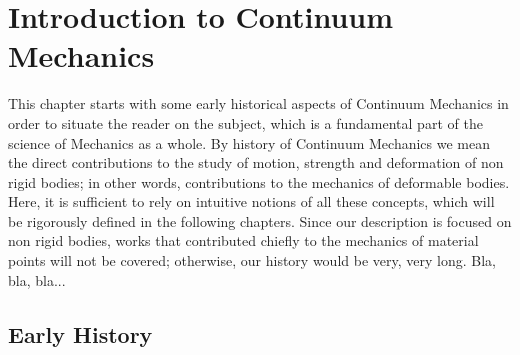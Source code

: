 \chapter{Introduction to Continuum Mechanics}\label{ch:Collect}


This chapter starts with some early historical aspects of Continuum Mechanics in order to situate the reader on the subject, which is a fundamental part of the science of Mechanics as a whole. By history of Continuum Mechanics we mean the direct contributions to the study of motion, strength and deformation of non rigid bodies; in other words, contributions to the mechanics of deformable bodies. Here, it is sufficient to rely on intuitive notions of all these concepts, which will be rigorously defined in the following chapters. Since our description is focused on non rigid bodies, works that contributed chiefly to the mechanics of material points will not be covered; otherwise, our history would be very, very long. Bla, bla, bla... 


\section{Early History}


